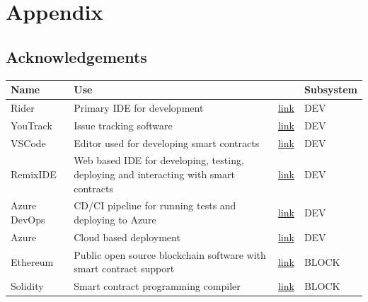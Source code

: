 \section{Appendix}

\subsection{Acknowledgements}

\begin{table}[H]
\centering
\begin{tabular}{|p{}|p{}|p{}|p{}|}
\hline
Name           & Use                                                                                   &                                               & Subsystem \\ \hline
Rider          & Primary IDE for development                                                           & \href{https://www.jetbrains.com/rider}{link}                  & DEV       \\ \hline
YouTrack       & Issue tracking software                                                               & \href{https://www.jetbrains.com/youtrack}{link}               & DEV       \\ \hline
VSCode         & Editor used for developing smart contracts                                            & \href{https://code.visualstudio.com}{link}                     & DEV       \\ \hline
RemixIDE       & Web based IDE for developing, testing, deploying and interacting with smart contracts & \href{https://remix.ethereum.org/}{link}                       & DEV       \\ \hline
Azure DevOps   & CD/CI pipeline for running tests and deploying to Azure                               & \href{https://azure.microsoft.com/en-us/services/devops}{link} & DEV       \\ \hline
Azure          & Cloud based deployment                                                                & \href{https://azure.microsoft.com/}{link}                      & DEV       \\ \hline
Ethereum       & Public open source blockchain software with smart contract support                    & \href{https://ethereum.org}{link}                              & BLOCK     \\ \hline
Solidity       & Smart contract programming compiler                                                   & \href{https://docs.soliditylang.org}{link}                     & BLOCK     \\ \hline

\end{tabular}
\end{table}
